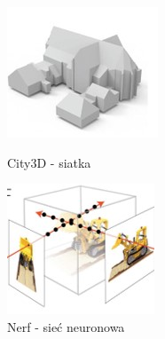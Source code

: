 \begin{figure}[!htb]
      \includegraphics[width=\linewidth]{img/city3dmesh.jpg}
      \caption{City3D - siatka}\label{fig:mesh_example}
    \endminipage\hfill
      \includegraphics[width=\linewidth]{img/nerfobject.jpg}
      \caption{Nerf - sieć neuronowa}\label{fig:nerf_example}
    \endminipage\hfill

\end{figure}
